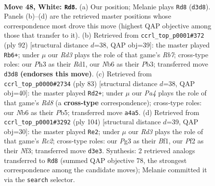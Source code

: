 \documentclass[11pt]{article}
\begin{document}
\clearpage

\begin{figure}[p]\centering
\begin{subfigure}{0.46\textwidth}\centering
\resizebox{\linewidth}{!}{%
\newchessgame
\chessboard[
  setfen={8/1p4bk/1N4p1/5p1p/P7/3R1KPP/2r1rP2/8 w - - 11 48},
  showmover=false,
  pgfstyle=straightmove, color=movearrow, markmove={d3-d8}
]}
\caption{}
\end{subfigure}\hfill
\begin{subfigure}{0.46\textwidth}\centering
\resizebox{\linewidth}{!}{%
\newchessgame
\chessboard[
  setfen={7r/1R6/p3k3/4p1p1/4P1p1/1P4Pr/1P4K1/3R4 w - - 5 47},
  showmover=false,
  pgfstyle=straightmove, color=movearrow, markmove={b7-b6}
]}
\caption{}
\end{subfigure}
\\[4pt]
\begin{subfigure}{0.46\textwidth}\centering
\resizebox{\linewidth}{!}{%
\newchessgame
\chessboard[
  setfen={1r4k1/2R2R1p/p7/1p4p1/P7/6P1/6KP/3r4 b - - 3 42},
  showmover=false,
  pgfstyle=straightmove, color=movearrow, markmove={d1-d2}
]}
\caption{}
\end{subfigure}\hfill
\begin{subfigure}{0.46\textwidth}\centering
\resizebox{\linewidth}{!}{%
\newchessgame
\chessboard[
  setfen={4r3/1p4k1/2p3p1/6P1/p7/P1P1rN2/2R2K2/5B2 w - - 3 53},
  showmover=false,
  pgfstyle=straightmove, color=movearrow, markmove={c2-e2}
]}
\caption{}
\end{subfigure}
\caption{\textbf{Move 48, White: \texttt{Rd8}.} (a) Our position; Melanie plays \texttt{Rd8} (\texttt{d3d8}). Panels (b)--(d) are the retrieved master positions whose correspondence most drove this move (highest QAP objective among those that transfer to it). (b) Retrieved from \texttt{ccrl\_top\_p0001\#372} (ply 92) [structural distance $d$=38, QAP obj=39]: the master played \texttt{Rb6+}; under $\mu$ our \emph{Rd3} plays the role of that game's \emph{Rb7}; cross-type roles: our \emph{P}h3 as their \emph{R}d1, our \emph{N}b6 as their \emph{P}b3; transferred move \texttt{d3d8} \textbf{(endorses this move)}. (c) Retrieved from \texttt{ccrl\_top\_p0000\#2734} (ply 83) [structural distance $d$=38, QAP obj=40]: the master played \texttt{Rd2+}; under $\mu$ our \emph{Pa4} plays the role of that game's \emph{Rd8} (a \textbf{cross-type} correspondence); cross-type roles: our \emph{N}b6 as their \emph{P}b5; transferred move \texttt{a4a5}. (d) Retrieved from \texttt{ccrl\_top\_p0001\#3292} (ply 104) [structural distance $d$=39, QAP obj=30]: the master played \texttt{Re2}; under $\mu$ our \emph{Rd3} plays the role of that game's \emph{Rc2}; cross-type roles: our \emph{P}g3 as their \emph{B}f1, our \emph{P}f2 as their \emph{N}f3; transferred move \texttt{d3e3}. Synthesis: 2 retrieved analogs transferred to \texttt{Rd8} (summed QAP objective 78, the strongest correspondence among the candidate moves); Melanie committed it via the \texttt{search} selector.}
\label{fig:thought-m94}
\end{figure}
\end{document}
